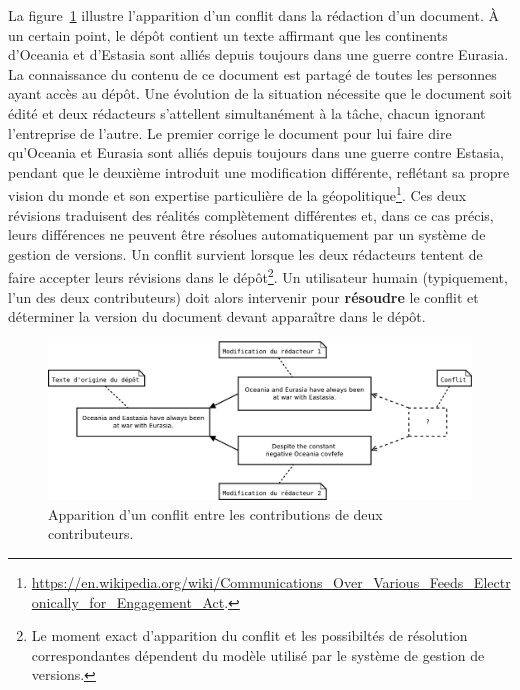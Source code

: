 La figure~\ref{fig:conflit} illustre l'apparition d'un conflit dans la
rédaction d'un document. À un certain point, le dépôt contient un
texte affirmant que les continents d'Oceania et d'Estasia sont alliés
depuis toujours dans une guerre contre Eurasia. La connaissance du
contenu de ce document est partagé de toutes les personnes ayant accès
au dépôt. Une évolution de la situation nécessite que le document soit
édité et deux rédacteurs s'attellent simultanément à la tâche, chacun
ignorant l'entreprise de l'autre. Le premier corrige le document pour
lui faire dire qu'Oceania et Eurasia sont alliés depuis toujours dans
une guerre contre Estasia, pendant que le deuxième introduit une
modification différente, reflétant sa propre vision du monde et son
expertise particulière de la
géopolitique\footnote{\url{https://en.wikipedia.org/wiki/Communications_Over_Various_Feeds_Electronically_for_Engagement_Act}.}. Ces
deux révisions traduisent des réalités complètement différentes et,
dans ce cas précis, leurs différences ne peuvent être résolues
automatiquement par un système de gestion de versions. Un conflit
survient lorsque les deux rédacteurs tentent de faire accepter leurs
révisions dans le dépôt\footnote{Le moment exact d'apparition du
  conflit et les possibiltés de résolution correspondantes dépendent
  du modèle utilisé par le système de gestion de versions.}. Un
utilisateur humain (typiquement, l'un des deux contributeurs) doit
alors intervenir pour
\textbf{résoudre} le conflit et
déterminer la version du document devant apparaître dans le dépôt.

\begin{figure}[h!]
  \includegraphics[width=15cm]{figures/conflit}
  \caption{Apparition d'un conflit entre les contributions de deux
    contributeurs.\label{fig:conflit}}
\end{figure}

